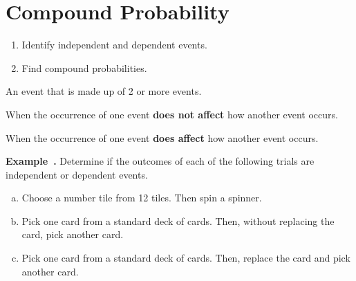 \documentclass{article}
\newcounter{example}[section]
\newenvironment{example}[1][]{\refstepcounter{example}\par\medskip
   {\color{red}\textbf{Example~\theexample. #1}}}{\medskip}
\begin{document}
\section*{Compound Probability}

\begin{tcolorbox}[colframe=orange!70!white, coltitle=black, title=\textbf{Today I Can}]
\begin{enumerate}
    \item Identify independent and dependent events.
    \item Find compound probabilities.
\end{enumerate}
\end{tcolorbox}
\smallskip

\begin{tcolorbox}[colframe=black!20!white, opacitybacktitle=0.1, coltitle=black, title=\textbf{Compound Event}]
An event that is made up of 2 or more events.
\end{tcolorbox}
\smallskip

\begin{tcolorbox}[colframe=black!20!white, opacitybacktitle=0.1, coltitle=black, title=\textbf{Independent Events}]
When the occurrence of one event \textbf{does not affect} how another event occurs.
\end{tcolorbox}
\smallskip

\begin{tcolorbox}[colframe=black!20!white, opacitybacktitle=0.1, coltitle=black, title=\textbf{Dependent Events}]
When the occurrence of one event \textbf{does affect} how another event occurs.
\end{tcolorbox}
\smallskip

\begin{example}
Determine if the outcomes of each of the following trials are independent or dependent events.
\begin{enumerate}[(a)]
    \item Choose a number tile from 12 tiles. Then spin a spinner.  \\[0.25in]
    \item Pick one card from a standard deck of cards. Then, without replacing the card, pick another card. \\[0.25in]
    \item Pick one card from a standard deck of cards. Then, replace the card and pick another card.    \\[0.25in]
\end{enumerate}
\end{example}
\end{document}
